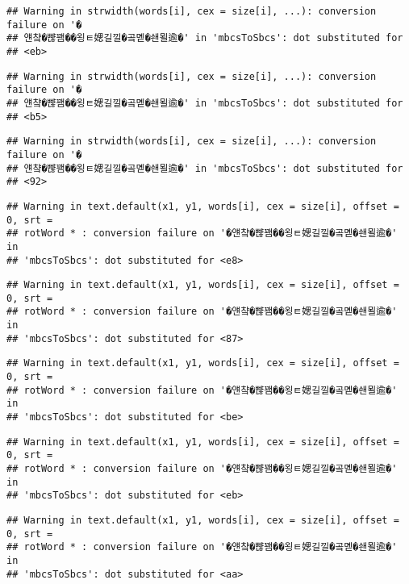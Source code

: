 \documentclass[]{article}
\begin{document}
\begin{verbatim}
## Warning in strwidth(words[i], cex = size[i], ...): conversion failure on '�
## 얜챸�뺞꽴��욍ㅌ媤길낄�곸몓�쇈묄逾�' in 'mbcsToSbcs': dot substituted for
## <eb>
\end{verbatim}

\begin{verbatim}
## Warning in strwidth(words[i], cex = size[i], ...): conversion failure on '�
## 얜챸�뺞꽴��욍ㅌ媤길낄�곸몓�쇈묄逾�' in 'mbcsToSbcs': dot substituted for
## <b5>
\end{verbatim}

\begin{verbatim}
## Warning in strwidth(words[i], cex = size[i], ...): conversion failure on '�
## 얜챸�뺞꽴��욍ㅌ媤길낄�곸몓�쇈묄逾�' in 'mbcsToSbcs': dot substituted for
## <92>
\end{verbatim}

\begin{verbatim}
## Warning in text.default(x1, y1, words[i], cex = size[i], offset = 0, srt =
## rotWord * : conversion failure on '�얜챸�뺞꽴��욍ㅌ媤길낄�곸몓�쇈묄逾�' in
## 'mbcsToSbcs': dot substituted for <e8>
\end{verbatim}

\begin{verbatim}
## Warning in text.default(x1, y1, words[i], cex = size[i], offset = 0, srt =
## rotWord * : conversion failure on '�얜챸�뺞꽴��욍ㅌ媤길낄�곸몓�쇈묄逾�' in
## 'mbcsToSbcs': dot substituted for <87>
\end{verbatim}

\begin{verbatim}
## Warning in text.default(x1, y1, words[i], cex = size[i], offset = 0, srt =
## rotWord * : conversion failure on '�얜챸�뺞꽴��욍ㅌ媤길낄�곸몓�쇈묄逾�' in
## 'mbcsToSbcs': dot substituted for <be>
\end{verbatim}

\begin{verbatim}
## Warning in text.default(x1, y1, words[i], cex = size[i], offset = 0, srt =
## rotWord * : conversion failure on '�얜챸�뺞꽴��욍ㅌ媤길낄�곸몓�쇈묄逾�' in
## 'mbcsToSbcs': dot substituted for <eb>
\end{verbatim}

\begin{verbatim}
## Warning in text.default(x1, y1, words[i], cex = size[i], offset = 0, srt =
## rotWord * : conversion failure on '�얜챸�뺞꽴��욍ㅌ媤길낄�곸몓�쇈묄逾�' in
## 'mbcsToSbcs': dot substituted for <aa>
\end{verbatim}
\end{document}
